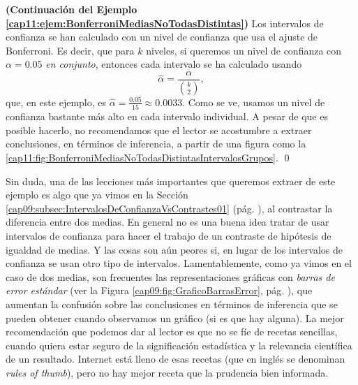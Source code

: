 \begin{ejemplo}{\bf (Continuación del Ejemplo \ref{cap11:ejem:BonferroniMediasNoTodasDistintas})}
Los intervalos de confianza se han calculado con un nivel de confianza que usa el ajuste de
Bonferroni. Es decir, que para $k$ niveles, si queremos un nivel de confianza con $\alpha=0.05$
{\em en conjunto}, entonces cada intervalo se ha calculado usando
\[\hat\alpha=\dfrac{\alpha}{\binom{k}{2}},\]
que, en este ejemplo, es $\hat\alpha=\frac{0.05}{15}\approx 0.0033$. Como se ve, usamos un nivel de
confianza bastante más alto en cada intervalo individual. A pesar de que es posible hacerlo, no recomendamos que el lector se acostumbre a extraer conclusiones, en términos de inferencia, a partir de una figura como la \ref{cap11:fig:BonferroniMediasNoTodasDistintasIntervalosGrupos}.
\qed
\end{ejemplo}

Sin duda, una de las lecciones más importantes que queremos extraer de este ejemplo es algo que ya vimos en la Sección \ref{cap09:subsec:IntervalosDeConfianzaVsContrastes01} (pág. \pageref{cap09:subsec:IntervalosDeConfianzaVsContrastes01}), al contrastar la diferencia entre dos medias. En general no es una buena idea  tratar de usar intervalos de confianza para hacer el trabajo de un contraste de hipótesis de igualdad de medias. Y las cosas son aún peores si, en lugar de los intervalos de confianza se usan otro tipo de intervalos.
Lamentablemente, como ya vimos en el caso de dos medias, son frecuentes las representaciones gráficas con {\em barras de error estándar} (ver la Figura \ref{cap09:fig:GraficoBarrasError}, pág. \pageref{cap09:fig:GraficoBarrasError}), que aumentan la confusión sobre las  conclusiones en términos de inferencia que se pueden obtener cuando observamos un gráfico (si es que hay alguna). La mejor recomendación que podemos dar al lector es que no se fíe de recetas sencillas, cuando quiera estar seguro de la significación  estadística y la relevancia científica de un resultado. Internet está lleno de esas recetas (que en inglés se denominan {\em rules of thumb}), pero no hay mejor receta que la prudencia bien informada.

